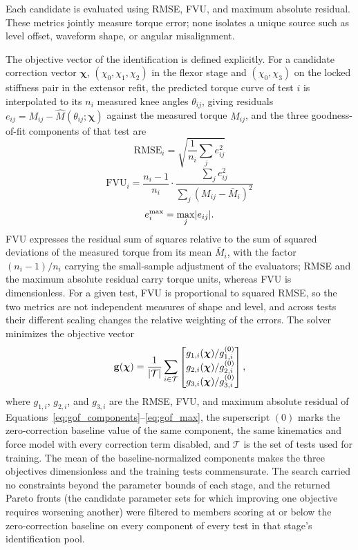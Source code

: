 Each candidate is evaluated using RMSE, FVU, and maximum absolute residual. These metrics jointly measure torque error; none isolates a unique source such as level offset, waveform shape, or angular misalignment.

The objective vector of the identification is defined explicitly. For a candidate correction vector $\boldsymbol{\chi}$, $(\chi_{0}, \chi_{1}, \chi_{2})$ in the flexor stage and $(\chi_{0}, \chi_{3})$ on the locked stiffness pair in the extensor refit, the predicted torque curve of test $i$ is interpolated to its $n_{i}$ measured knee angles $\theta_{ij}$, giving residuals $e_{ij} = M_{ij} - \hat{M}(\theta_{ij}; \boldsymbol{\chi})$ against the measured torque $M_{ij}$, and the three goodness-of-fit components of that test are
\begin{equation}
\mathrm{RMSE}_{i} = \sqrt{\frac{1}{n_{i}}\sum_{j} e_{ij}^{2}}\label{eq:gof_components}
\end{equation}
\begin{equation}
\mathrm{FVU}_{i} = \frac{n_{i}-1}{n_{i}} \cdot \frac{\sum_{j} e_{ij}^{2}}{\sum_{j} (M_{ij} - \bar{M}_{i})^{2}}\label{eq:gof_fvu}
\end{equation}
\begin{equation}
e^{\max}_{i} = \max_{j} \lvert e_{ij}\rvert.\label{eq:gof_max}
\end{equation}
FVU expresses the residual sum of squares relative to the sum of squared deviations of the measured torque from its mean $\bar{M}_{i}$, with the factor $(n_{i}-1)/n_{i}$ carrying the small-sample adjustment of the evaluators; RMSE and the maximum absolute residual carry torque units, whereas FVU is dimensionless. For a given test, FVU is proportional to squared RMSE, so the two metrics are not independent measures of shape and level, and across tests their different scaling changes the relative weighting of the errors. The solver minimizes the objective vector
\begin{equation}
\mathbf{g}(\boldsymbol{\chi}) = \frac{1}{\lvert\mathcal{T}\rvert} \sum_{i \in \mathcal{T}}
\begin{bmatrix}
g_{1,i}(\boldsymbol{\chi})/g_{1,i}^{(0)} \\
g_{2,i}(\boldsymbol{\chi})/g_{2,i}^{(0)} \\
g_{3,i}(\boldsymbol{\chi})/g_{3,i}^{(0)}
\end{bmatrix},
\label{eq:gof_objective}
\end{equation}
where $g_{1,i}$, $g_{2,i}$, and $g_{3,i}$ are the RMSE, FVU, and maximum absolute residual of Equations~\eqref{eq:gof_components}--\eqref{eq:gof_max}, the superscript $(0)$ marks the zero-correction baseline value of the same component, the same kinematics and force model with every correction term disabled, and $\mathcal{T}$ is the set of tests used for training. The mean of the baseline-normalized components makes the three objectives dimensionless and the training tests commensurate. The search carried no constraints beyond the parameter bounds of each stage, and the returned Pareto fronts (the candidate parameter sets for which improving one objective requires worsening another) were filtered to members scoring at or below the zero-correction baseline on every component of every test in that stage's identification pool.

